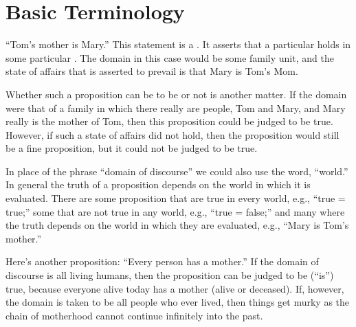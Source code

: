 \documentclass[letterpaper,10pt,english]{sphinxmanual}
\begin{document}
\section{Basic Terminology}
\label{\detokenize{09-propositional-logic:basic-terminology}}
“Tom’s mother is Mary.” This statement is a . It asserts
that a particular  holds in some particular . The domain in this case would be some family unit, and
the state of affairs that is asserted to prevail is that Mary is Tom’s
Mom.

Whether such a proposition can be  to be  or not is
another matter. If the domain were that of a family in which there
really are people, Tom and Mary, and Mary really is the mother of Tom,
then this proposition could be judged to be true. However, if such a
state of affairs did not hold, then the proposition would still be a
fine proposition, but it could not be judged to be true.

In place of the phrase “domain of discourse” we could also use the
word, “world.” In general the truth of a proposition depends on the
world in which it is evaluated. There are some proposition that are
true in every world, e.g., “true = true;” some that are not true in
any world, e.g., “true = false;” and many where the truth depends on
the world in which they are evaluated, e.g., “Mary is Tom’s mother.”

Here’s another proposition: “Every person has a mother.” If the domain
of discourse is all living humans, then the proposition can be judged
to be (“is”) true, because everyone alive today has a mother (alive or
deceased). If, however, the domain is taken to be all people who ever
lived, then things get murky as the chain of  motherhood cannot
continue infinitely into the past.
\end{document}
